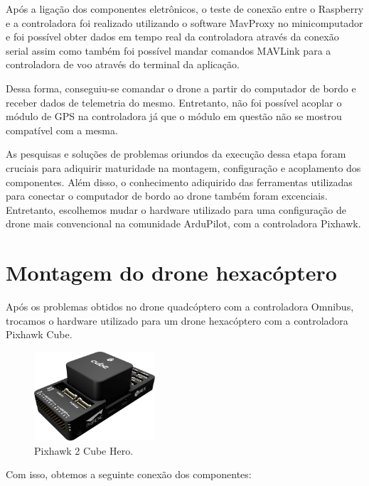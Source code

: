 \documentclass[12pt,a4paper,oneside]{book}
\begin{document}
Após a ligação dos componentes eletrônicos, o teste de conexão entre o Raspberry e a controladora foi realizado utilizando o software MavProxy no minicomputador e foi possível obter dados em tempo real da controladora através da conexão serial assim como também foi possível mandar comandos MAVLink para a controladora de voo através do terminal da aplicação.

Dessa forma, conseguiu-se comandar o drone a partir do computador de bordo e receber dados de telemetria do mesmo. Entretanto, não foi possível acoplar o módulo de GPS na controladora já que o módulo em questão não se mostrou compatível com a mesma.

As pesquisas e soluções de problemas oriundos da execução dessa etapa foram cruciais para adiquirir maturidade na montagem, configuração e acoplamento dos componentes. Além disso, o conhecimento adiquirido das ferramentas utilizadas para conectar o computador de bordo ao drone também foram excenciais. Entretanto, escolhemos mudar o hardware utilizado para uma configuração de drone mais convencional na comunidade ArduPilot, com a controladora Pixhawk. 


\section{Montagem do drone hexacóptero}

Após os problemas obtidos no drone quadcóptero com a controladora Omnibus, trocamos o hardware utilizado para um drone hexacóptero com a controladora Pixhawk Cube. 
%
\begin{figure}[!htbp]
  \centering
  \includegraphics[width=0.4\textwidth]{Images/Desenvolvimento/pixhawk2_cube_hero.png}
  \caption{Pixhawk 2 Cube Hero.}
  \label{fig:pixhawk2_cube_hero.png.0}
\end{figure}
%

Com isso, obtemos a seguinte conexão dos componentes:
\end{document}
